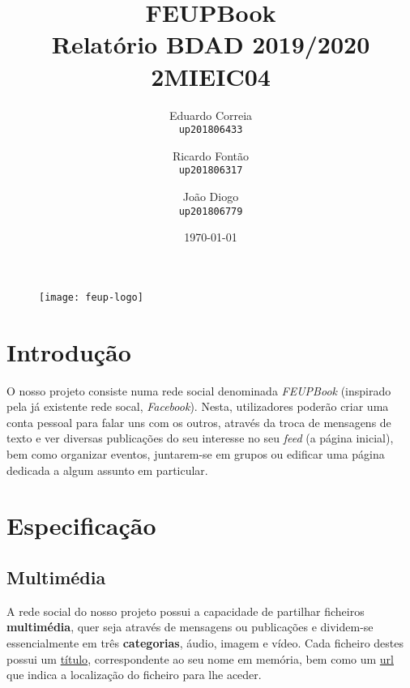 \documentclass{report}
\begin{document}
\title{\Huge{\textbf{FEUPBook}} \\ Relatório BDAD 2019/2020 \\ \Large{2MIEIC04}}
\author{Eduardo Correia \\ \texttt{up201806433} \and
	    Ricardo Fontão \\  \texttt{up201806317} \and
        João Diogo \\ \texttt{up201806779}}
\date{\today}

\begin{figure}[b] %
    \centering
    \texttt{[image: feup-logo]}
\end{figure}

\maketitle

\tableofcontents

\chapter{Introdução}

O nosso projeto consiste numa rede social denominada \textit{FEUPBook} (inspirado pela já existente rede socal,  \textit{Facebook}). Nesta, utilizadores poderão criar uma conta pessoal para falar uns com os outros, através da troca de mensagens de texto e ver diversas publicações do seu interesse no seu \textit{feed} (a página inicial), bem como organizar eventos, juntarem-se em grupos ou edificar uma página dedicada a algum assunto em particular.

\chapter{Especificação} 

\section{Multimédia}

A rede social do nosso projeto possui a capacidade de partilhar ficheiros \textbf{multimédia}, quer seja através de mensagens ou publicações e dividem-se essencialmente em três \textbf{categorias}, áudio, imagem e vídeo. Cada ficheiro destes possui um \underline{título}, correspondente ao seu nome em memória, bem como um \underline{url} que indica a localização do ficheiro para lhe aceder. \par
\end{document}
